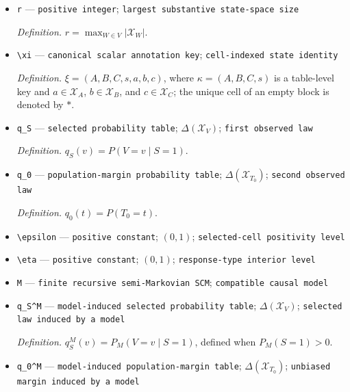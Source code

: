\documentclass{article}
\begin{document}
\begin{itemize}
  \par\smallskip\noindent\emph{Definition.} For every \(A\subseteq V\), \(\mathcal X_A=\prod_{W\in A}\mathcal X_W\).
  \item \texttt{r} --- \texttt{positive integer}; \texttt{largest substantive state-\allowbreak{}space size}
  \par\smallskip\noindent\emph{Definition.} \(r=\max_{W\in V}\lvert\mathcal X_W\rvert\).
  \item \texttt{\textbackslash{}\allowbreak{}xi} --- \texttt{canonical scalar annotation key}; \texttt{cell-\allowbreak{}indexed state identity}
  \par\smallskip\noindent\emph{Definition.} \(\xi=(A,B,C,s,a,b,c)\), where \(\kappa=(A,B,C,s)\) is a table-level key and \(a\in\mathcal X_A\), \(b\in\mathcal X_B\), and \(c\in\mathcal X_C\); the unique cell of an empty block is denoted by \(\ast\).
  \item \texttt{q\_\allowbreak{}S} --- \texttt{selected probability table}; \(\Delta(\mathcal X_V)\); \texttt{first observed law}
  \par\smallskip\noindent\emph{Definition.} \(q_S(v)=P(V=v\mid S=1)\).
  \item \texttt{q\_\allowbreak{}0} --- \texttt{population-\allowbreak{}margin probability table}; \(\Delta(\mathcal X_{T_0})\); \texttt{second observed law}
  \par\smallskip\noindent\emph{Definition.} \(q_0(t)=P(T_0=t)\).
  \item \texttt{\textbackslash{}\allowbreak{}epsilon} --- \texttt{positive constant}; \((0,1)\); \texttt{selected-\allowbreak{}cell positivity level}
  \item \texttt{\textbackslash{}\allowbreak{}eta} --- \texttt{positive constant}; \((0,1)\); \texttt{response-\allowbreak{}type interior level}
  \item \texttt{M} --- \texttt{finite recursive semi-\allowbreak{}Markovian SCM}; \texttt{compatible causal model}
  \item \texttt{q\_\allowbreak{}S\textasciicircum{}M} --- \texttt{model-\allowbreak{}induced selected probability table}; \(\Delta(\mathcal X_V)\); \texttt{selected law induced by a model}
  \par\smallskip\noindent\emph{Definition.} \(q_S^M(v)=P_M(V=v\mid S=1)\), defined when \(P_M(S=1)>0\).
  \item \texttt{q\_\allowbreak{}0\textasciicircum{}M} --- \texttt{model-\allowbreak{}induced population-\allowbreak{}margin table}; \(\Delta(\mathcal X_{T_0})\); \texttt{unbiased margin induced by a model}

\end{itemize}
\end{document}
